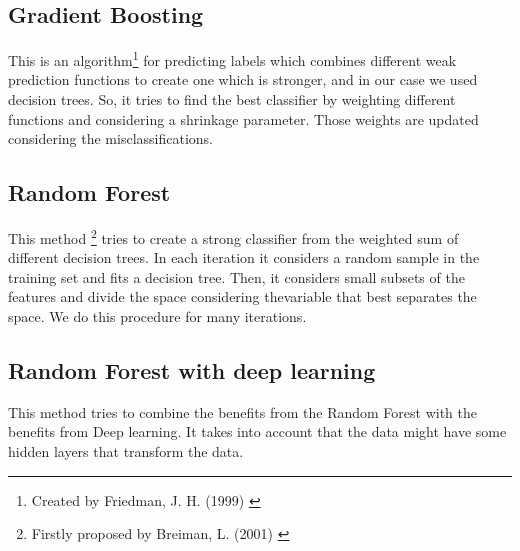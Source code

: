 \documentclass[paper=a4, fontsize=12pt]{scrartcl}
\numberwithin{equation}{section}
\numberwithin{figure}{section}
\numberwithin{table}{section}
\begin{document}
\subsection{Gradient Boosting}
This is an algorithm\footnote{Created by Friedman, J. H. (1999) \cite{Friedman00greedyfunction}} for predicting labels which combines different weak prediction functions to create one which is stronger, and in our case we used decision trees. So, it tries to find the best classifier by weighting different functions and considering a shrinkage parameter. Those weights are updated considering the misclassifications. 


\subsection{Random Forest}
This method \footnote{Firstly proposed by Breiman, L. (2001) \cite{random} } tries to create a strong classifier from the weighted sum of different decision trees. In each iteration it considers a random sample in the training set and fits a decision tree. Then, it considers small subsets of the features and divide the space considering thevariable that best separates the space. We do this procedure for many iterations. 


\subsection{Random Forest with deep learning}
This  method tries to combine the benefits from the Random Forest with the benefits from Deep learning. It takes into account that the data might have some hidden layers that transform the data. 



\newpage




\end{document}
